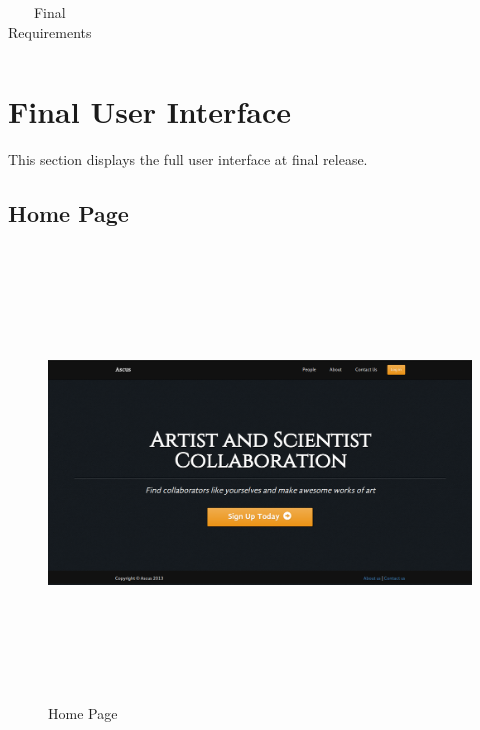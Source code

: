 \documentclass[a4paper,oneside,11pt]{report}
\begin{document}
\begin{appendices}
\begin{center}
\begin{table}[!ht]
\begin{tabular}[ht]{| p{5cm} | p{5cm} | l | l |}
    \end{tabular}
    \caption{Final Requirements}
\label{tab:xyz}
    \end{table}
    \end{center}
    
\section{Final User Interface}
This section displays the full user interface at final release. 
\subsection{Home Page}
\begin{figure}[!ht]
\centering
\includegraphics[width=\textwidth,height=12cm,keepaspectratio]{appendix/third-iteration-full-homepage.png}
\caption{Home Page}
\end{figure}


\end{appendices}
\end{document}
